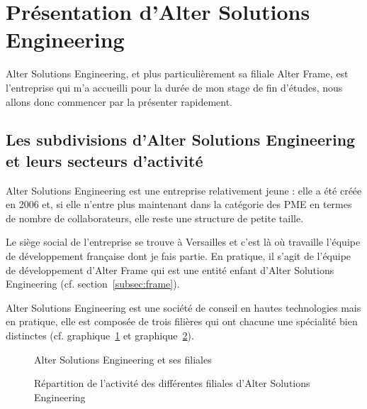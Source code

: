 \section{Présentation d'Alter Solutions Engineering}
Alter Solutions Engineering, et plus particulièrement sa filiale Alter Frame, est l'entreprise qui m'a accueilli pour la durée de mon stage de fin d'études, nous allons donc commencer par la présenter rapidement.

\subsection{Les subdivisions d'Alter Solutions Engineering et leurs secteurs d'activité}
Alter Solutions Engineering est une entreprise relativement jeune : elle a été créée en 2006 et, si elle n'entre plus maintenant dans la catégorie des PME en termes de nombre de collaborateurs, elle reste une structure de petite taille.

Le siège social de l'entreprise se trouve à Versailles et c'est là où travaille l'équipe de développement française dont je fais partie. En pratique, il s'agit de l'équipe de développement d'Alter Frame qui est une entité enfant d'Alter Solutions Engineering (cf. section~\ref{subsec:frame}).

Alter Solutions Engineering est une société de conseil en hautes technologies mais en pratique, elle est composée de trois filières qui ont chacune une spécialité bien distinctes (cf. graphique~\ref{fig:filiales} et graphique~\ref{fig:activite}).
\begin{figure}
  \centering
  \caption{Alter Solutions Engineering et ses filiales}
  \label{fig:filiales}
\end{figure}
\begin{figure}
  \caption{Répartition de l'activité des différentes filiales d'Alter Solutions Engineering}
  \label{fig:activite}
\end{figure}


